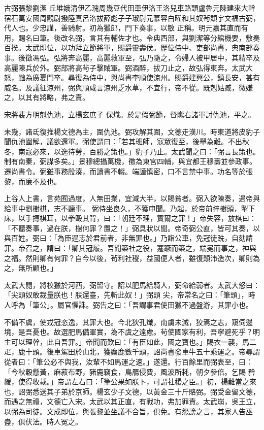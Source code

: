 
\begin{pinyinscope}

 古弼張黎劉潔
 丘堆娥清伊乙瑰周幾豆代田車伊洛王洛兒車路頭盧魯元陳建來大幹宿石萬安國周觀尉撥陸真呂洛拔薛彪子子琡尉元慕容白曜和其奴茍頹宇文福古弼，代人也。少忠謹，善騎射。初為獵郎，門下奏事，以敏
 正稱。明元嘉其直而有用，賜名曰筆。後改名弼，言其有輔佐才也。令典西部，與劉潔等分綰機要，敷奏百揆。太武即位，以功拜立節將軍，賜爵靈壽侯。歷位侍中、吏部尚書，典南部奏事。後徵馮弘。弘將奔高麗，高麗救軍至，弘乃隨之，令婦人被甲居中，其精卒及高麗陳兵於外。弼部將高茍子擊賊軍。弼酒醉，拔刀止之，故弘得東奔。太武大怒，黜為廣夏門卒。尋復為侍中，與尚書李順使涼州。賜爵建興公，鎮長安，甚有威名。及議征涼州，弼與順咸言涼州乏水草，不宜行，帝不從。既剋姑臧，微嫌之，以其有將略，弗之責。



 宋將裴方明剋仇池，立楊玄庶子
 保熾。於是假弼節，督隴右諸軍討仇池，平之。



 未幾，諸氐復推楊文德為主，圍仇池。弼攻解其圍，文德走漢川。時東道將皮豹子聞仇池圍解，議欲還軍。弼使謂曰：「若其班師，寇眾復至，後舉為難。不出秋冬，南寇必來，以逸待勞，百勝之策也。」豹子乃止。太武聞之曰：「弼言長策也。制有南秦，弼謀多矣。」景穆總攝萬機，徵為東宮四輔，與宜都王穆壽並參政事。遷尚書令。弼雖事務殷湊，而讀書不輟。端謹慎密，口不言禁中事。功名等於張黎，而廉不及也。



 上谷人上書，言苑囿過度，人無田業，宜減大半，以賜貧者。弼入欲陳奏，遇帝與給事中劉樹棋，志不聽事。
 弼侍坐良久，不獲申聞。乃起，於帝前捽樹頭，掣下床，以手搏棋耳，以拳毆其背，曰：「朝廷不理，實爾之罪！」帝失容，放棋曰：「不聽奏事，過在朕，樹何罪？置之！」弼具狀以聞。帝奇弼公直，皆可其奏，以與百姓。弼曰：「為臣逞志於君前者，非無罪也。」乃詣公車，免冠徒跣，自劾請罪。帝召之，謂曰：「卿其冠履。吾聞築社之役，蹇蹶而築之，端冕而事之，神與之福。然則卿有何罪？自今以後，茍利社稷，益國便人者，雖復顛沛造次，卿則為之，無所顧也。」



 太武大閱，將校獵於河西，弼留守。詔以肥馬給騎人，弼命給弱者。太武大怒曰：「尖頭奴敢裁量朕也！朕還臺，先斬此奴！」弼頭
 尖，帝常名之曰：「筆頭」，時人呼為「筆公」。屬官懼誅。弼告之曰：「吾謂事君使田獵不過盤游，其罪小也。



 不備不虞，使戎冠恣逸，其罪大也。今北狄孔熾，南虜未滅，狡焉之志，窺伺邊境，是吾憂也。故選肥馬備軍實，為不虞之遠慮。茍使國家有利，吾寧避死乎？明主可以理幹，此自吾罪。」帝聞而歎曰：「有臣如此，國之寶也。」賜衣一襲，馬二疋，鹿十頭。後車駕田於山北，獲麋鹿數千頭，詔尚書發車牛五十乘運之。帝尋謂從者曰：「筆公必不與我，汝輩不如馬運之速。」遂還。行百餘里而弼表至，曰：「今秋穀懸黃，麻菽布野，豬鹿竊食，鳥鴈侵費，風波所耗，朝夕參倍。乞賜
 矜緩，使得收載。」帝謂左右曰：「筆公果如朕卜，可謂社稷之臣。」初，楊難當之來也，詔弼悉送其子弟於京師。楊玄少子文德，以黃金三十斤賂弼。弼受金留文德，而遇之無禮，文德亡入宋。太武以其正直，有戰功，弗加罪責。太武崩，吳王立，以弼為司徒。文成即位，與張黎並坐議不合旨，俱免。有怨謗之言，其家人告巫蠱，俱伏法。時人冤之。




\end{pinyinscope}
